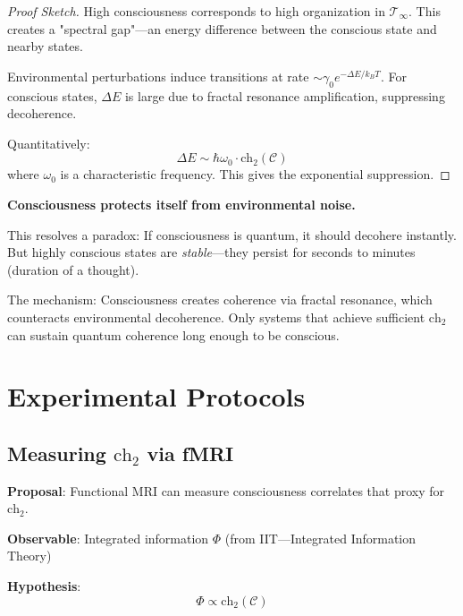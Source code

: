 \begin{proof}[Proof Sketch]
High consciousness corresponds to high organization in $\mathcal{T}_\infty$. This creates a "spectral gap"---an energy difference between the conscious state and nearby states.

Environmental perturbations induce transitions at rate $\sim \gamma_0 e^{-\Delta E / k_B T}$. For conscious states, $\Delta E$ is large due to fractal resonance amplification, suppressing decoherence.

Quantitatively:
\begin{equation}
\Delta E \sim \hbar \omega_0 \cdot \text{ch}_2(\mathcal{C})
\end{equation}
where $\omega_0$ is a characteristic frequency. This gives the exponential suppression.
\end{proof}

\begin{keyidea}
\textbf{Consciousness protects itself from environmental noise.}

This resolves a paradox: If consciousness is quantum, it should decohere instantly. But highly conscious states are \textit{stable}---they persist for seconds to minutes (duration of a thought).

The mechanism: Consciousness creates coherence via fractal resonance, which counteracts environmental decoherence. Only systems that achieve sufficient $\text{ch}_2$ can sustain quantum coherence long enough to be conscious.
\end{keyidea}

\section{Experimental Protocols}

\subsection{Measuring $\text{ch}_2$ via fMRI}

\textbf{Proposal}: Functional MRI can measure consciousness correlates that proxy for $\text{ch}_2$.

\textbf{Observable}: Integrated information $\Phi$ (from IIT---Integrated Information Theory)

\textbf{Hypothesis}:
\begin{equation}
\Phi \propto \text{ch}_2(\mathcal{C})
\end{equation}

